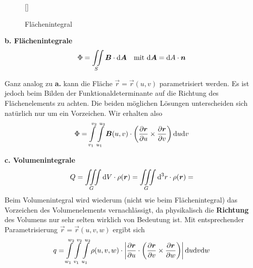 \begin{wrapfigure}[10]{r}[0cm]{0cm}
	\raisebox{0pt}[\dimexpr{}\baselineskip\relax]{
		\colorbox{hgrey}{
		}
	}
	\caption{Flächenintegral}
\end{wrapfigure}


\textbf{b. Flächenintegrale}\\
\begin{equation*}
\Phi=\iint\limits_{S}\bm{B}\cdot\mathrm{d} \bm{A} \ \ \ \text{mit } \mathrm{d}\bm{A}=\mathrm{d} A\cdot\bm{n}
\end{equation*}


Ganz analog zu \textbf{a.} kann die Fläche $\vec{r}=\vec{r}(u,v)$ parametrisiert werden. Es ist jedoch beim Bilden der Funktionaldeterminante auf die Richtung des Flächenelements zu achten. Die beiden möglichen Lösungen unterscheiden sich natürlich nur um ein Vorzeichen. Wir erhalten also
\begin{equation*}
\Phi=\int\limits_{v_1}^{v_2}\int\limits_{u_1}^{u_2}\bm{B}(u,v)\cdot\left(\frac{\partial{\bm{r}}}{\partial{u}}\times\frac{\partial{\bm{r}}}{\partial{v}}\right)\mathrm{d} u\mathrm{d} v
\end{equation*}

\textbf{c. Volumenintegrale}\\
\linebreak
\begin{equation*}
Q=\iiint\limits_G\mathrm{d} V\cdot\rho(\bm{r})=\iiint\limits_G\mathrm{d} ^3 r\cdot\rho(\bm{r})=
\end{equation*}
Beim Volumenintegral wird wiederum (nicht wie beim Flächenintegral) das Vorzeichen des Volumenelements vernachlässigt, da physikalisch die \textbf{Richtung} des Volumens nur sehr selten wirklich von Bedeutung ist. Mit entsprechender Parametrisierung $\vec{r}=\vec{r}(u,v,w)$ ergibt sich
\begin{equation*}
q=\int\limits_{w_1}^{w_2}\int\limits_{v_1}^{v_2}\int\limits_{u_1}^{u_2}\rho(u,v,w)\cdot\left|\frac{\partial{\bm{r}}}{\partial{u}}\cdot\left(\frac{\partial{\bm{r}}}{\partial{v}}\times\frac{\partial{\bm{r}}}{\partial{w}}\right)\right|\mathrm{d} u\mathrm{d} v\mathrm{d} w
\end{equation*}

